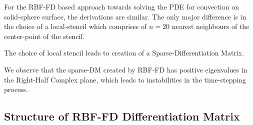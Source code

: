 \documentclass[11pt]{article}
\begin{document}
For the RBF-FD based approach towards solving the PDE for convection on solid-sphere surface, the derivations are similar. The only major difference is in the choice of a local-stencil which comprises of $n=20$ nearest neighbours of the center-point of the stencil. 

The choice of local stencil leads to creation of a Sparse-Differentiation Matrix. 

We observe that the sparse-DM created by RBF-FD has positive eigenvalues in the Right-Half Complex plane, which leads to instabilities in the time-stepping process. 

\subsection{Structure of RBF-FD Differentiation Matrix}
\end{document}
